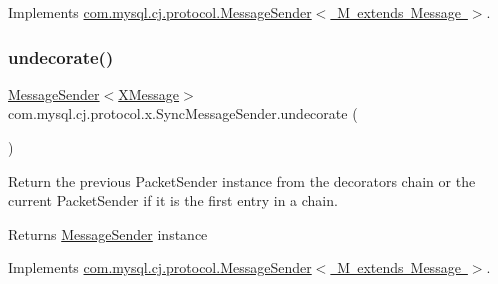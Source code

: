 Implements \mbox{\hyperlink{interfacecom_1_1mysql_1_1cj_1_1protocol_1_1_message_sender_a31345b7817dcc7e982bb96dba97b3a01}{com.\+mysql.\+cj.\+protocol.\+Message\+Sender$<$ M extends Message $>$}}.

\mbox{\label{classcom_1_1mysql_1_1cj_1_1protocol_1_1x_1_1_sync_message_sender_aa8fd388e5d4e5e86cb35add7f6e45c7b}} 
\subsubsection{\texorpdfstring{undecorate()}{undecorate()}}
{\footnotesize\ttfamily \mbox{\hyperlink{interfacecom_1_1mysql_1_1cj_1_1protocol_1_1_message_sender}{Message\+Sender}}$<$\mbox{\hyperlink{classcom_1_1mysql_1_1cj_1_1protocol_1_1x_1_1_x_message}{X\+Message}}$>$ com.\+mysql.\+cj.\+protocol.\+x.\+Sync\+Message\+Sender.\+undecorate (\begin{DoxyParamCaption}{ }\end{DoxyParamCaption})}

Return the previous Packet\+Sender instance from the decorators chain or the current Packet\+Sender if it is the first entry in a chain.

\begin{DoxyReturn}{Returns}
\mbox{\hyperlink{interfacecom_1_1mysql_1_1cj_1_1protocol_1_1_message_sender}{Message\+Sender}} instance 
\end{DoxyReturn}


Implements \mbox{\hyperlink{interfacecom_1_1mysql_1_1cj_1_1protocol_1_1_message_sender_a3a352bf35ad98dc6cea7c1f4ac9480da}{com.\+mysql.\+cj.\+protocol.\+Message\+Sender$<$ M extends Message $>$}}.

\mbox{\label{classcom_1_1mysql_1_1cj_1_1protocol_1_1x_1_1_sync_message_sender_a7228daf021acf6d8505108645317825d}} 
